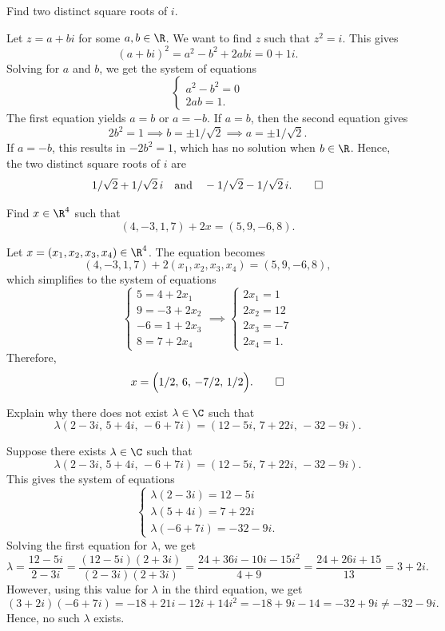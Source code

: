 \begin{exercise}
Find two distinct square roots of $i$.
\end{exercise}
\begin{solution}
Let $z=a+bi$ for some $a,b\in\R$. We want to find $z$ such that $z^2=i$. This
gives
\[ (a+bi)^2 = a^2-b^2+2abi = 0+1i. \]
Solving for $a$ and $b$, we get the system of equations
\[ \begin{cases} a^2-b^2=0\\ 2ab=1. \end{cases} \]
The first equation yields $a=b$ or $a=-b$. If $a=b$, then the second equation
gives
\[ 2b^2=1 \implies b=\pm1/\sqrt2 \implies a=\pm1/\sqrt2. \]
If $a=-b$, this results in $-2b^2=1$, which has no solution when $b\in\R$.
Hence, the two distinct square roots of $i$ are
\[ 1/\sqrt2+1/\sqrt2\,i \quad\text{and}\quad
   -1/\sqrt2-1/\sqrt2\,i. \qedhere \]
\end{solution}

\begin{exercise}
Find $x\in\R^4$ such that
\[ (4,-3,1,7)+2x=(5,9,-6,8). \]
\end{exercise}
\begin{solution}
Let $x=(x_1,x_2,x_3,x_4)\in\R^4$. The equation becomes
\[ (4,-3,1,7)+2(x_1,x_2,x_3,x_4)=(5,9,-6,8), \]
which simplifies to the system of equations
\[ \begin{cases} 5=4+2x_1\\ 9=-3+2x_2\\ -6=1+2x_3\\ 8=7+2x_4 \end{cases}
   \implies
   \begin{cases} 2x_1=1\\ 2x_2=12\\ 2x_3=-7\\ 2x_4=1. \end{cases} \]
Therefore,
\[ x=\Bigl(1/2,\,6,\,-7/2,\,1/2\Bigr). \qedhere \]
\end{solution}

\begin{exercise}
Explain why there does not exist $\lambda\in\C$ such that
\[ \lambda(2-3i,\,5+4i,\,-6+7i)=(12-5i,\,7+22i,\,-32-9i). \]
\end{exercise}
\begin{solution}
Suppose there exists $\lambda\in\C$ such that
\[ \lambda(2-3i,\,5+4i,\,-6+7i)=(12-5i,\,7+22i,\,-32-9i). \]
This gives the system of equations
\[ \begin{cases} \lambda(2-3i)=12-5i\\ \lambda(5+4i)=7+22i\\ \lambda(-6+7i)=-32-9i. \end{cases} \]
Solving the first equation for $\lambda$, we get
\[ \lambda=\frac{12-5i}{2-3i}=\frac{(12-5i)(2+3i)}{(2-3i)(2+3i)}
   =\frac{24+36i-10i-15i^2}{4+9}=\frac{24+26i+15}{13}=3+2i. \]
However, using this value for $\lambda$ in the third equation, we get
\[ (3+2i)(-6+7i)=-18+21i-12i+14i^2=-18+9i-14=-32+9i\ne-32-9i. \]
Hence, no such $\lambda$ exists.
\end{solution}


